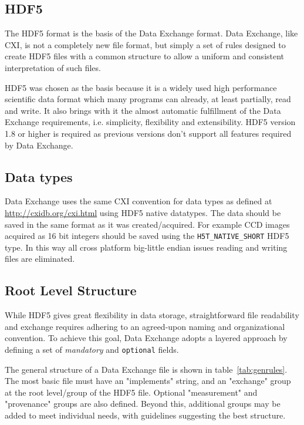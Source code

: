 \subsection{HDF5}

The HDF5 format is the basis of the Data Exchange format. Data Exchange, like
CXI, is not a completely new file format, but simply a set of rules designed
to create HDF5 files with a common structure to allow a uniform and
consistent interpretation of such files.

HDF5 was chosen as the basis because it is a widely used high performance
scientific data format which many programs can already, at least partially,
read and write. It also brings with it the almost automatic fulfillment of the
Data Exchange requirements, i.e. simplicity, flexibility and extensibility.
HDF5 version 1.8 or higher is required as previous versions don't support all
features required by Data Exchange.

\subsection{Data types}

Data Exchange uses the same CXI convention for data types as defined at 
\url{http://cxidb.org/cxi.html} using HDF5 native datatypes.  The data should
be saved in the same format as it was created/acquired. For example CCD images
acquired as 16 bit integers should be saved using the {\tt H5T\_NATIVE\_SHORT}
HDF5 type. In this way all cross platform big-little endian issues reading and
writing files are eliminated.

\subsection{Root Level Structure}
\label{DataExchange}

While HDF5 gives great flexibility in data storage, straightforward file
readability and exchange requires adhering to an agreed-upon naming and
organizational convention. To achieve this goal, Data Exchange adopts a
layered approach by defining a set of \emph{mandatory} and
{\tt optional} fields. 

The general structure of a Data Exchange file is shown in table~\ref{tab:genrules}.
The most basic file must have an "implements" string, and an "exchange" group at
the root level/group of the HDF5 file. Optional "measurement" and "provenance"
groups are also defined. Beyond this, additional groups may be added to meet
individual needs, with guidelines suggesting the best structure.

